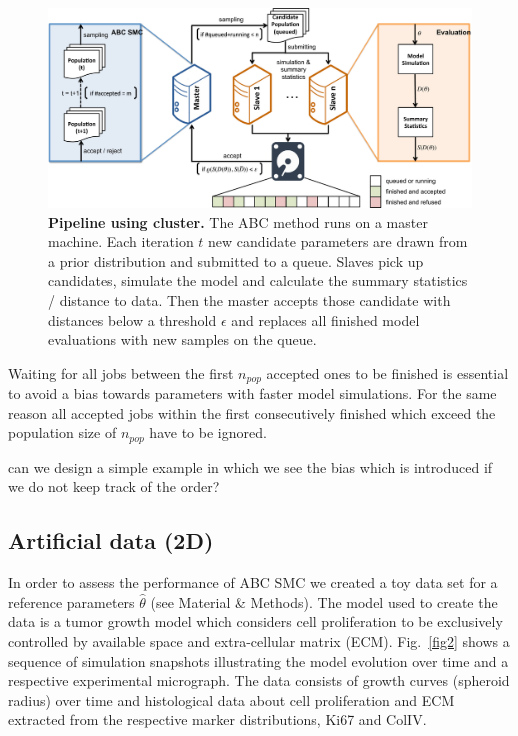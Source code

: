 \documentclass[10pt,letterpaper]{article}
\newcommand{\jh}[1]{{\color{red}#1}}
\begin{document}
\begin{figure}[htbp]
\includegraphics[width=\textwidth]{Figures/Pipeline.pdf}
\caption{{\bf Pipeline using cluster.}
The ABC method runs on a master machine. Each iteration $t$ new candidate parameters are drawn from a prior distribution and submitted to a queue. Slaves pick up candidates, simulate the model and calculate the summary statistics / distance to data. Then the master accepts those candidate with distances below a threshold $\epsilon$ and replaces all finished model evaluations with new samples on the queue.}
\label{fig1}
\end{figure}

Waiting for all jobs between the first $n_{pop}$ accepted ones to be finished is essential to avoid a bias towards parameters with faster model simulations. For the same reason all accepted jobs within the first consecutively finished which exceed the population size of $n_{pop}$ have to be ignored. 

\jh{can we design a simple example in which we see the bias which is introduced if we do not keep track of the order?}

\subsection*{Artificial data (2D)}

In order to assess the performance of ABC SMC we created a toy data set for a reference parameters $\hat{\theta}$ (see Material \& Methods). The model used to create the data is a tumor growth model which considers cell proliferation to be exclusively controlled by available space and extra-cellular matrix (ECM). Fig.~\ref{fig2} shows a sequence of simulation snapshots illustrating the model evolution over time and a respective experimental micrograph. The data consists of growth curves (spheroid radius) over time and histological data about cell proliferation and ECM extracted from the respective marker distributions, Ki67 and ColIV.  
\end{document}
